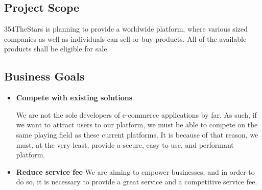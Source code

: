 \documentclass[11pt]{article}
\newcounter{use case ID}
\begin{document}
\subsection{Project Scope}
354TheStars is planning to provide a worldwide platform, where various sized companies as well as individuals can sell or buy products. All of the available products shall be eligible for sale.

\subsection{Business Goals}

\begin{itemize}
    \item \textbf{Compete with existing solutions}

        We are not the sole developers of e-commerce applications by far. As such, if we want to attract users to our platform, we must be able to compete on the same playing field as these current platforms. It is because of that reason, we must, at the very least, provide a secure, easy to use, and performant platform.

    \item \textbf{Reduce service fee}
        We are aiming to empower businesses, and in order to do so, it is necessary to provide a great service and a competitive service fee.

\end{itemize}
\end{document}
